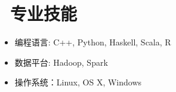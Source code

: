 \documentclass{resume}
\begin{document}

\section{\faCogs\ 专业技能}
\begin{itemize}[parsep=0.5ex]
  \item 编程语言: C++, Python, Haskell, Scala, R
  \item 数据平台: Hadoop, Spark
  \item 操作系统：Linux, OS X, Windows
\end{itemize}


%
%
\end{document}
